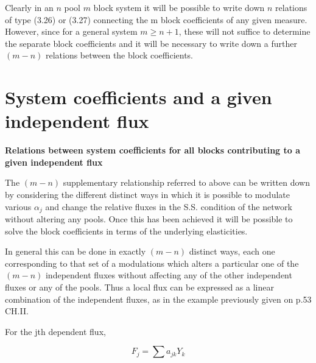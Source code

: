 Clearly in an $n$ pool $m$ block system it will be possible to write down $n$ relations of type (3.26) or (3.27) connecting the m block coefficients of any given measure. However, since for a general system $m \geq n+1$, these will not suffice to determine the separate block coefficients and it will be necessary to write down a further $(m-n)$ relations between the block coefficients.

\section{System coefficients and a given independent flux}

{\bf Relations between system coefficients for all blocks contributing to a given independent flux}

The $(m-n)$ supplementary relationship referred to above can be written down by considering the different distinct ways in which it is possible to modulate various $\alpha_{j}$ and change the relative fluxes in the S.S. condition of the network without altering any pools. Once this has been achieved it will be possible to solve the block coefficients in terms of the underlying elasticities.

In general this can be done in exactly $(m-n)$ distinct ways, each one corresponding to that set of a modulations which alters a particular one of the $(m-n)$ independent fluxes without affecting any of the other independent fluxes or any of the pools. Thus a local flux can be expressed as a linear combination of the independent fluxes, as in the example previously given on p.53 CH.II.

For the jth dependent flux,

\begin{equation}
F_{j}= \sum a_{jk} Y_{k}
\label{eqn:328}
\end{equation}

